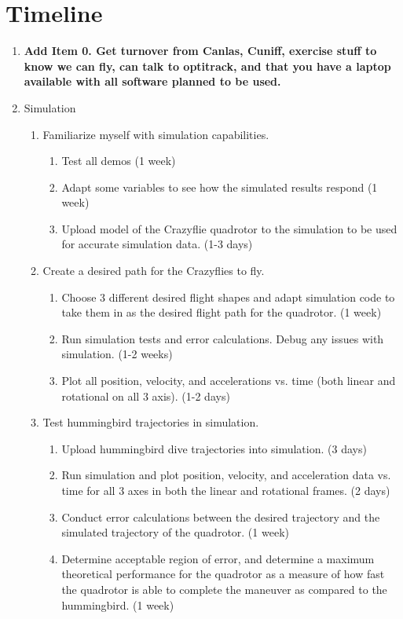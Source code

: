 \documentclass[onecolumn,10pt]{IEEEtran}
\begin{document}
\section{Timeline}

\begin{enumerate}
\item \textbf{Add Item 0. Get turnover from Canlas, Cuniff, exercise stuff to know we can fly, can talk to optitrack, and that you have a laptop available with all software planned to be used.}

\item Simulation
\begin{enumerate}
\item Familiarize myself with simulation capabilities.
\begin{enumerate}
\item Test all demos (1 week)
 \item Adapt some variables to see how the simulated results respond (1 week)
\item Upload model of the Crazyflie quadrotor to the simulation to be used for accurate simulation data. (1-3 days) 
\end{enumerate}

\item Create a desired path for the Crazyflies to fly.
\begin{enumerate}
\item Choose 3 different desired flight shapes and adapt simulation code to take them in as the desired flight path for the quadrotor. (1 week)
\item Run simulation tests and error calculations. Debug any issues with simulation. (1-2 weeks)
\item Plot all position, velocity, and accelerations vs. time (both linear and rotational on all 3 axis). (1-2 days)
\end{enumerate}

\item Test hummingbird trajectories in simulation.
\begin{enumerate}
\item Upload hummingbird dive trajectories into simulation. (3 days)
 \item Run simulation and plot position, velocity, and acceleration data vs. time for all 3 axes in both the linear and rotational frames. (2 days)
\item Conduct error calculations between the desired trajectory and the simulated trajectory of the quadrotor. (1 week)
\item Determine acceptable region of error, and determine a maximum theoretical performance for the quadrotor as a measure of how fast the quadrotor is able to complete the maneuver as compared to the hummingbird. (1 week)
\end{enumerate}
\end{enumerate}
 

\end{enumerate}
\end{document}
